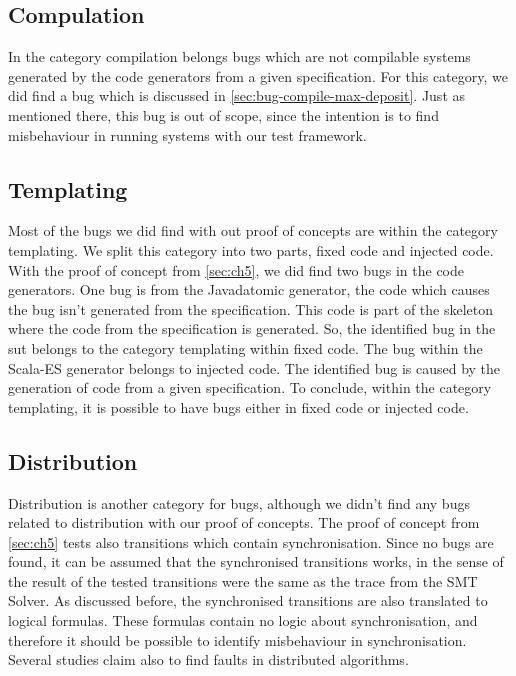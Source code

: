 \subsection{Compulation}
In the category compilation belongs bugs which are not compilable systems generated by the code generators from a given specification. For this category, we did find a bug which is discussed in \autoref{sec:bug-compile-max-deposit}. Just as mentioned there, this bug is out of scope, since the intention is to find misbehaviour in running systems with our test framework.

\subsection{Templating}
Most of the bugs we did find with out proof of concepts are within the category templating. We split this category into two parts, fixed code and injected code. With the proof of concept from \autoref{sec:ch5}, we did find two bugs in the code generators. One bug is from the Javadatomic generator, the code which causes the bug isn't generated from the specification. This code is part of the skeleton where the code from the specification is generated. So, the identified bug in the \gls{sut} belongs to the category templating within fixed code. The bug within the Scala-ES generator belongs to injected code. The identified bug is caused by the generation of code from a given specification. To conclude, within the category templating, it is possible to have bugs either in fixed code or injected code.

\subsection{Distribution}
Distribution is another category for bugs, although we didn't find any bugs related to distribution with our proof of concepts. The proof of concept from \autoref{sec:ch5} tests also transitions which contain synchronisation. Since no bugs are found, it can be assumed that the synchronised transitions works, in the sense of the result of the tested transitions were the same as the trace from the SMT Solver. As discussed before, the synchronised transitions are also translated to logical formulas. These formulas contain no logic about synchronisation, and therefore it should be possible to identify misbehaviour in synchronisation. Several studies claim also to find faults in distributed algorithms.

